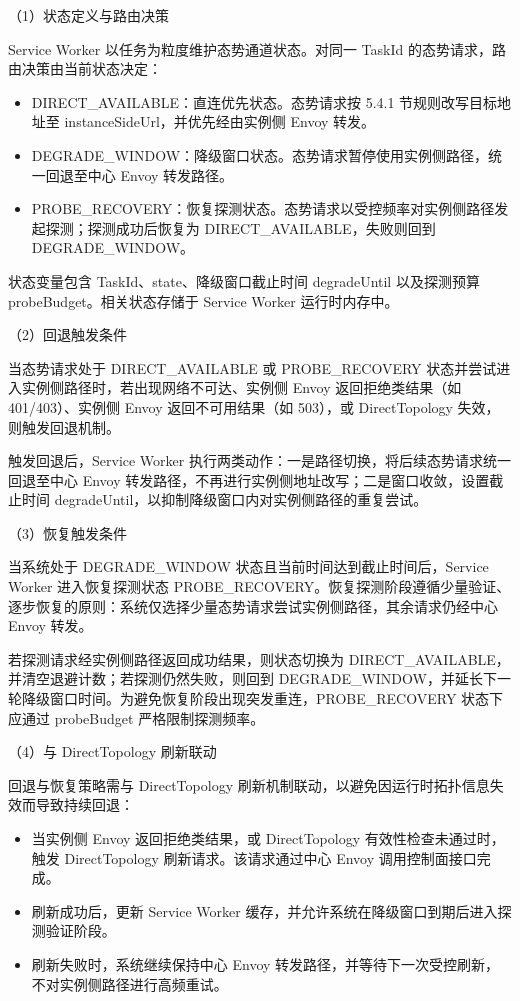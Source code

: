 \documentclass[lang=chs, degree=master, blindreview=true, winfonts=true, academic=false]{yanputhesis}
\begin{document}
（1）状态定义与路由决策

Service Worker 以任务为粒度维护态势通道状态。对同一 TaskId 的态势请求，路由决策由当前状态决定：
\begin{itemize}
    \item DIRECT\_AVAILABLE：直连优先状态。态势请求按 5.4.1 节规则改写目标地址至 instanceSideUrl，并优先经由实例侧 Envoy 转发。
    \item DEGRADE\_WINDOW：降级窗口状态。态势请求暂停使用实例侧路径，统一回退至中心 Envoy 转发路径。
    \item PROBE\_RECOVERY：恢复探测状态。态势请求以受控频率对实例侧路径发起探测；探测成功后恢复为 DIRECT\_AVAILABLE，失败则回到 DEGRADE\_WINDOW。
\end{itemize}

状态变量包含 TaskId、state、降级窗口截止时间 degradeUntil 以及探测预算 probeBudget。相关状态存储于 Service Worker 运行时内存中。

（2）回退触发条件

当态势请求处于 DIRECT\_AVAILABLE 或 PROBE\_RECOVERY 状态并尝试进入实例侧路径时，若出现网络不可达、实例侧 Envoy 返回拒绝类结果（如 401/403）、实例侧 Envoy 返回不可用结果（如 503），或 DirectTopology 失效，则触发回退机制。

触发回退后，Service Worker 执行两类动作：一是路径切换，将后续态势请求统一回退至中心 Envoy 转发路径，不再进行实例侧地址改写；二是窗口收敛，设置截止时间 degradeUntil，以抑制降级窗口内对实例侧路径的重复尝试。

（3）恢复触发条件

当系统处于 DEGRADE\_WINDOW 状态且当前时间达到截止时间后，Service Worker 进入恢复探测状态 PROBE\_RECOVERY。恢复探测阶段遵循少量验证、逐步恢复的原则：系统仅选择少量态势请求尝试实例侧路径，其余请求仍经中心 Envoy 转发。

若探测请求经实例侧路径返回成功结果，则状态切换为 DIRECT\_AVAILABLE，并清空退避计数；若探测仍然失败，则回到 DEGRADE\_WINDOW，并延长下一轮降级窗口时间。为避免恢复阶段出现突发重连，PROBE\_RECOVERY 状态下应通过 probeBudget 严格限制探测频率。

（4）与 DirectTopology 刷新联动

回退与恢复策略需与 DirectTopology 刷新机制联动，以避免因运行时拓扑信息失效而导致持续回退：
\begin{itemize}
    \item 当实例侧 Envoy 返回拒绝类结果，或 DirectTopology 有效性检查未通过时，触发 DirectTopology 刷新请求。该请求通过中心 Envoy 调用控制面接口完成。
    \item 刷新成功后，更新 Service Worker 缓存，并允许系统在降级窗口到期后进入探测验证阶段。
    \item 刷新失败时，系统继续保持中心 Envoy 转发路径，并等待下一次受控刷新，不对实例侧路径进行高频重试。
\end{itemize}
\end{document}
